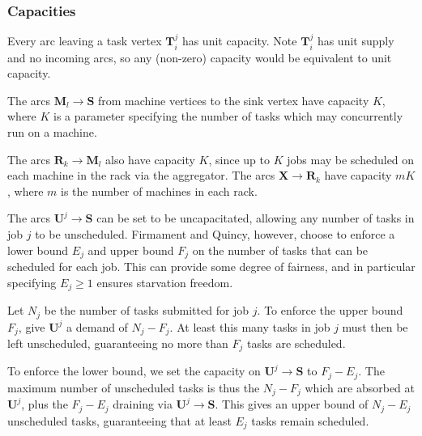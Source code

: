 \subsubsection{Capacities}

Every arc leaving a task vertex $\mathbf{T}_i^j$ has unit capacity. Note $\mathbf{T}_i^j$ has unit supply and no incoming arcs, so any (non-zero) capacity would be equivalent to unit capacity.

The arcs $\mathbf{M}_l \to \mathbf{S}$ from machine vertices to the sink vertex have capacity $K$, where $K$ is a parameter specifying the number of tasks which may concurrently run on a machine\footnotemark.

The arcs $\mathbf{R}_k \to \mathbf{M}_l$ also have capacity $K$, since up to $K$ jobs may be scheduled on each machine in the rack via the aggregator. The arcs $\mathbf{X} \to \mathbf{R}_k$ have capacity $mK$, where $m$ is the number of machines in each rack\footnotemark.

The arcs $\mathbf{U}^j \to \mathbf{S}$ can be set to be uncapacitated, allowing any number of tasks in job $j$ to be unscheduled. Firmament and Quincy, however, choose to enforce a lower bound $E_j$ and upper bound $F_j$ on the number of tasks that can be scheduled for each job. This can provide some degree of fairness, and in particular specifying $E_j \geq 1$ ensures starvation freedom.

Let $N_j$ be the number of tasks submitted for job $j$. To enforce the upper bound $F_j$, give $\mathbf{U}^j$ a demand of $N_j - F_j$. At least this many tasks in job $j$ must then be left unscheduled, guaranteeing no more than $F_j$ tasks are scheduled.

To enforce the lower bound, we set the capacity on $\mathbf{U}^j \to \mathbf{S}$ to $F_j - E_j$. The maximum number of unscheduled tasks is thus the $N_j - F_j$ which are absorbed at $\mathbf{U}^j$, plus the $F_j - E_j$ draining via $\mathbf{U}^j \to \mathbf{S}$. This gives an upper bound of $N_j - E_j$ unscheduled tasks, guaranteeing that at least $E_j$ tasks remain scheduled.

